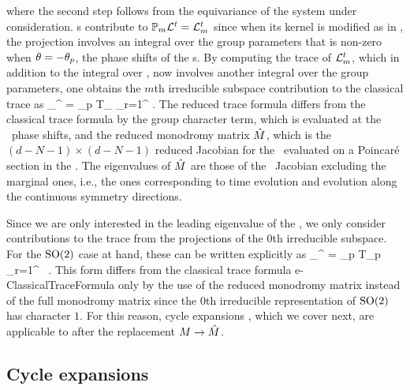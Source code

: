 \documentclass[aip,cha,
reprint,
secnumarabic,
nofootinbib, tightenlines,
nobibnotes, showkeys, showpacs,
superscriptaddress,
]{revtex4-1}
\begin{document}
{where the second step follows from the equivariance of the system 
under consideration. \Rpo s contribute to 
$\mathbb{P}_m {\cal L}^t = {\cal L}_m^t$ since when its kernel is modified as 
in , the projection involves an integral over the 
group parameters that is non-zero when $\theta= - \theta_{p}$, 
the phase shifts of the \rpo s. By computing the trace of ${\cal L}_m^t$, 
which in addition to the integral over \statesp , now involves 
another integral over the group parameters, one obtains the $m$th 
irreducible subspace contribution to the classical trace as
\beq
\sum_{}^{\infty}  = \sum_p T_{\rpprime}
\sum_{r=1}^{\infty}  .
The reduced trace formula  differs 
from the classical trace formula  
by the group character term, which is evaluated at the \rpo\ phase 
shifts, and the reduced monodromy matrix $\hat{{M}}$, which is 
the $(d-N-1)\times(d-N-1)$ reduced Jacobian for the \rpo\ evaluated 
on a Poincar\'e section in the \reducedsp . The eigenvalues of 
$\hat{{M}}$ are those of the \rpo\ Jacobian 
 excluding the marginal ones, i.e., the ones 
corresponding to time evolution and evolution along the continuous 
symmetry directions.

Since we are only interested in the leading eigenvalue of the 
\evOper , we only consider contributions to the trace 
 from the projections 
 of the $0$th irreducible subspace. For 
the $\textrm{SO}(2)$ case at hand, these can be written explicitly as
\beq
\sum_{}^{\infty}  = \sum_p T_p
\sum_{r=1}^{\infty}  \, .
This form differs from the classical trace formula 
{e-ClassicalTraceFormula} only by the use of the reduced monodromy 
matrix instead of the full monodromy matrix since the $0$th 
irreducible representation of $\textrm{SO}(2)$ has character $1$. For 
this reason, cycle expansions , which we cover next, are 
applicable to  after the replacement 
${M} \rightarrow \hat{{M}}$.

\subsection{Cycle expansions}
\label{s-CycExp}

}
\end{document}
